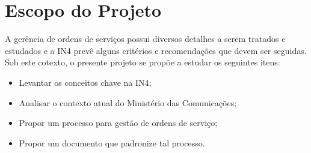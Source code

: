 \section{Escopo do Projeto}

A gerência de ordens de serviços possui diversos detalhes a serem tratados e
estudados e a IN4 prevê alguns critérios e recomendações que devem ser seguidas.
Sob este cotexto, o presente projeto se propõe a estudar os seguintes itens:

\begin{itemize}
  \item Levantar os conceitos chave na IN4;
  \item Analisar o contexto atual do Ministério das Comunicações;
  \item Propor um processo para gestão de ordens de serviço;
  \item Propor um documento que padronize tal processo.
\end{itemize}

